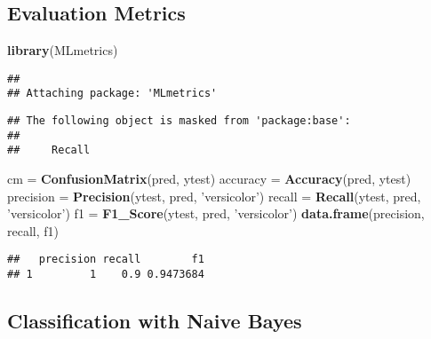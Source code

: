 \documentclass[]{article}
\newenvironment{Shaded}{\begin{snugshade}}{\end{snugshade}}
\newcommand{\KeywordTok}[1]{\textcolor[rgb]{0.13,0.29,0.53}{\textbf{#1}}}
\newcommand{\NormalTok}[1]{#1}
\newcommand{\StringTok}[1]{\textcolor[rgb]{0.31,0.60,0.02}{#1}}
\begin{document}
\hypertarget{evaluation-metrics}{%
\subsection{Evaluation Metrics}\label{evaluation-metrics}}

\begin{Shaded}
\begin{Highlighting}[]
\KeywordTok{library}\NormalTok{(MLmetrics)}
\end{Highlighting}
\end{Shaded}

\begin{verbatim}
## 
## Attaching package: 'MLmetrics'
\end{verbatim}

\begin{verbatim}
## The following object is masked from 'package:base':
## 
##     Recall
\end{verbatim}

\begin{Shaded}
\begin{Highlighting}[]
\NormalTok{cm =}\StringTok{ }\KeywordTok{ConfusionMatrix}\NormalTok{(pred, ytest)}
\NormalTok{accuracy =}\StringTok{ }\KeywordTok{Accuracy}\NormalTok{(pred, ytest)}
\NormalTok{precision =}\StringTok{ }\KeywordTok{Precision}\NormalTok{(ytest, pred, }\StringTok{'versicolor'}\NormalTok{)}
\NormalTok{recall =}\StringTok{ }\KeywordTok{Recall}\NormalTok{(ytest, pred, }\StringTok{'versicolor'}\NormalTok{)}
\NormalTok{f1 =}\StringTok{ }\KeywordTok{F1_Score}\NormalTok{(ytest, pred, }\StringTok{'versicolor'}\NormalTok{)}
\KeywordTok{data.frame}\NormalTok{(precision, recall, f1)}
\end{Highlighting}
\end{Shaded}

\begin{verbatim}
##   precision recall        f1
## 1         1    0.9 0.9473684
\end{verbatim}

\hypertarget{classification-with-naive-bayes}{%
\subsection{Classification with Naive
Bayes}\label{classification-with-naive-bayes}}
\end{document}

